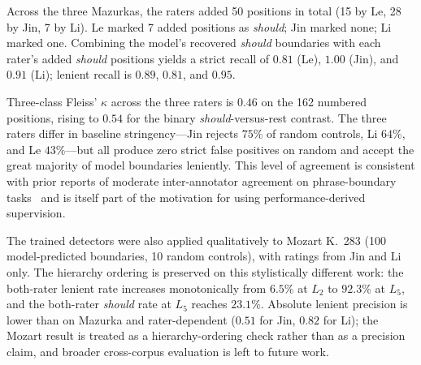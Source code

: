 \documentclass{article}
\begin{document}
Across the three Mazurkas, the raters added 50 positions in total (15 by Le, 28 by Jin, 7 by Li). Le marked 7 added positions as \emph{should}; Jin marked none; Li marked one. Combining the model's recovered \emph{should} boundaries with each rater's added \emph{should} positions yields a strict recall of \(0.81\) (Le), \(1.00\) (Jin), and \(0.91\) (Li); lenient recall is \(0.89\), \(0.81\), and \(0.95\).

Three-class Fleiss' \(\kappa\) across the three raters is \(0.46\) on the 162 numbered positions, rising to \(0.54\) for the binary \emph{should}-versus-rest contrast. The three raters differ in baseline stringency---Jin rejects \(75\%\) of random controls, Li \(64\%\), and Le \(43\%\)---but all produce zero strict false positives on random and accept the great majority of model boundaries leniently. This level of agreement is consistent with prior reports of moderate inter-annotator agreement on phrase-boundary tasks~\cite{McFee2017HierarchicalAnnotations,Wang2017CrowdsourcingSegmentation} and is itself part of the motivation for using performance-derived supervision.

The trained detectors were also applied qualitatively to Mozart K.~283 (100 model-predicted boundaries, 10 random controls), with ratings from Jin and Li only. The hierarchy ordering is preserved on this stylistically different work: the both-rater lenient rate increases monotonically from $6.5\%$ at $L_2$ to $92.3\%$ at $L_5$, and the both-rater \emph{should} rate at $L_5$ reaches $23.1\%$. Absolute lenient precision is lower than on Mazurka and rater-dependent ($0.51$ for Jin, $0.82$ for Li); the Mozart result is treated as a hierarchy-ordering check rather than as a precision claim, and broader cross-corpus evaluation is left to future work.

\begin{table}[t]
  \centering
  \caption{Precision of model-predicted boundaries vs randomly placed controls under the controlled human evaluation, pooled across M06-1, M06-2, and M06-3. All three raters assign zero \emph{should} labels to random controls and accept the large majority of model boundaries leniently.}
  \label{tab:human_precision}
\end{table}
\end{document}

